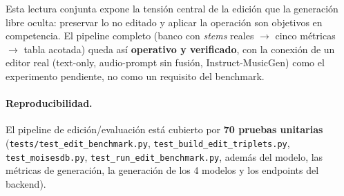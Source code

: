 Esta lectura conjunta expone la tensión central de la edición que la generación
libre oculta: preservar lo no editado y aplicar la operación son objetivos en
competencia. El pipeline completo (banco con \textit{stems} reales $\to$ cinco
métricas $\to$ tabla acotada) queda así \textbf{operativo y verificado}, con la
conexión de un editor real (text-only, audio-prompt sin fusión, Instruct-MusicGen)
como el experimento pendiente, no como un requisito del benchmark.

\paragraph{Reproducibilidad.} El pipeline de edición/evaluación está cubierto por
\textbf{70 pruebas unitarias} (\texttt{tests/test\_edit\_benchmark.py},
\texttt{test\_build\_edit\_triplets.py}, \texttt{test\_moisesdb.py},
\texttt{test\_run\_edit\_benchmark.py}, además del modelo, las métricas de
generación, la generación de los 4 modelos y los endpoints del backend).
